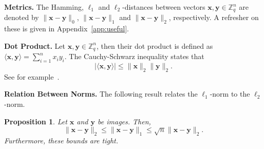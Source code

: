 \documentclass[pdflatex,sn-mathphys-num]{sn-jnl}
\newcommand{\descr}[1]{\vspace{0.2cm} \noindent \textbf{#1}}
\newtheorem{proposition}{Proposition}
\theoremstyle{definition}
\newcommand{\vtr}[1]{\mathbf{#1}}
\newcommand{\norm}[1]{\lVert{#1}\rVert}
\begin{document}
\descr{Metrics.} The Hamming, $\ell_1$ and $\ell_2$-distances between vectors $\vtr{x}, \vtr{y} \in \mathbb{Z}_q^n$ are denoted by $\norm{\vtr{x} - \vtr{y}}_0$, $\norm{\vtr{x} - \vtr{y}}_1$ and $\norm{\vtr{x} - \vtr{y}}_2$, respectively. A refresher on these is given in Appendix~\ref{app:useful}.

\descr{Dot Product.} Let $\vtr{x}, \vtr{y} \in \mathbb{Z}_q^n$, then their dot product is defined as $\langle \vtr{x}, \vtr{y} \rangle = \sum_{i = 1}^n x_i y_i$. 
The Cauchy-Schwarz inequality states that 
\[
\left| \langle \vtr{x}, \vtr{y} \rangle \right| \leq \norm{\vtr{x}}_2 \norm{\vtr{y}}_2. 
\]
See for example~\cite[\S 2.2]{shurman2016calculus}.

\descr{Relation Between Norms.} The following result relates the $\ell_1$-norm to the $\ell_2$-norm.
\begin{proposition}
\label{prop:l1-l2-relation}
Let $\vtr{x}$ and $\vtr{y}$ be images. Then,
\begin{equation}
\label{eq:l1-l2-relation}
 \norm{\vtr{x} - \vtr{y}}_2 \leq \norm{\vtr{x} - \vtr{y}}_1 \leq \sqrt{n}\norm{\vtr{x} - \vtr{y}}_2.   
\end{equation}
Furthermore, these bounds are tight. 
\end{proposition}
\end{document}
